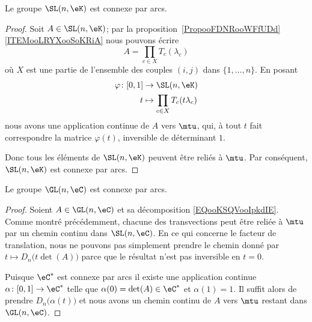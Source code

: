 \begin{proposition}     \label{PROPooALQCooLZCKrH}
	Le groupe \( \SL(n,\eK)\) est connexe par arcs.
\end{proposition}

\begin{proof}
	Soit \( A\in \SL(n,\eK)\); par la proposition~\ref{PropooFDNRooWFfUDd}\ref{ITEMooLRYXooSoKRiA} nous pouvons écrire
	\begin{equation}
		A=\prod_{c\in X}T_c(\lambda_c)
	\end{equation}
	où \( X\) est une partie de l'ensemble des couples \( (i,j)\) dans \( \{ 1,\ldots, n \}\). En posant
	\begin{equation}
		\begin{aligned}
			\varphi\colon \mathopen[ 0 , 1 \mathclose] & \to \SL(n,\eK)                        \\
			t                                          & \mapsto \prod_{c\in X}T_c(t\lambda_c)
		\end{aligned}
	\end{equation}
	nous avons une application continue de \( A\) vers \( \mtu\), qui, à tout \( t\) fait correspondre la matrice \( \varphi(t)\), inversible de déterminant \( 1\).

	Donc tous les éléments de \( \SL(n,\eK)\) peuvent être reliés à \( \mtu\). Par conséquent, \( \SL(n,\eK)\) est connexe par arcs.
\end{proof}

\begin{proposition}\label{PROPooVJNIooMByUJQ}
	Le groupe \( \GL(n,\eC)\) est connexe par arcs.
\end{proposition}

\begin{proof}
	Soient \( A\in\GL(n,\eC)\) et sa décomposition \eqref{EQooKSQVooIpkdIE}. Comme montré précédemment, chacune des transvections peut être reliée à \( \mtu\) par un chemin continu dans \( \SL(n,\eC)\). En ce qui concerne le facteur de translation,  nous ne pouvons pas simplement prendre le chemin donné par \( t\mapsto D_n\big( t\det(A) \big)\) parce que le résultat n'est pas inversible en \( t=0\).

	Puisque \( \eC^*\) est connexe par arcs il existe une application continue \( \alpha\colon \mathopen[ 0 , 1 \mathclose]\to \eC^*\) telle que \( \alpha(0)=\det(A)\in \eC^*\) et \( \alpha(1)=1\). Il suffit alors de prendre \( D_n\big( \alpha(t) \big)\) et nous avons un chemin continu de \( A\) vers \( \mtu\) restant dans \( \GL(n,\eC)\).
\end{proof}

